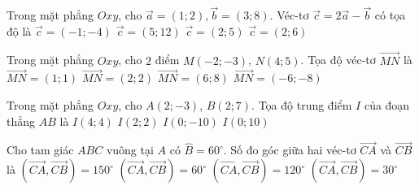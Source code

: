 \begin{ex}%
Trong mặt phẳng $Oxy$, cho $\overrightarrow{a}=(1;2),\overrightarrow{b}=(3;8)$. Véc-tơ $\overrightarrow{c}=2\overrightarrow{a}-\overrightarrow{b}$ có tọa độ là
\choice
{\True $\overrightarrow{c}=(-1;-4)$}
{$\overrightarrow{c}=(5;12)$}
{$\overrightarrow{c}=(2;5)$}
{$\overrightarrow{c}=(2;6)$}
\end{ex}

\begin{ex}%
Trong mặt phẳng $Oxy$, cho $2$ điểm $M(-2;-3)$, $N(4;5)$. Tọa độ véc-tơ $\overrightarrow{MN}$ là
\choice
{$\overrightarrow{MN}=(1;1)$}
{$\overrightarrow{MN}=(2;2)$}
{\True $\overrightarrow{MN}=(6;8)$}
{$\overrightarrow{MN}=(-6;-8)$}
\end{ex}

\begin{ex}%
Trong mặt phẳng $Oxy$, cho $A(2;-3)$, $B(2;7)$. Tọa độ trung điểm $I$ của đoạn thẳng $AB$ là
\choice
{$I(4;4)$}
{\True $I(2;2)$}
{$I(0;-10)$}
{$I(0;10)$}
\end{ex}

\begin{ex}%
Cho tam giác $ABC$ vuông tại $A$ có $\widehat{B}=60^\circ$. Số đo góc giữa hai véc-tơ $\overrightarrow{CA}$ và $\overrightarrow{CB}$ là
\choice
{$\left(\overrightarrow{CA},\overrightarrow{CB}\right)=150^\circ$}
{$\left(\overrightarrow{CA},\overrightarrow{CB}\right)=60^\circ$}
{$\left(\overrightarrow{CA},\overrightarrow{CB}\right)=120^\circ$}
{\True $\left(\overrightarrow{CA},\overrightarrow{CB}\right)=30^\circ$}
\end{ex}


